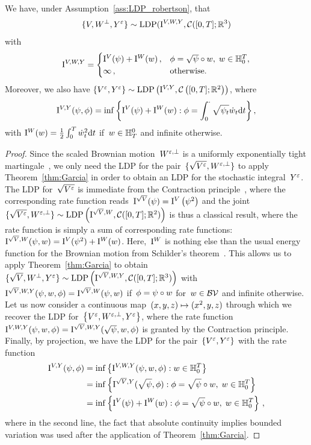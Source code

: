 \begin{theorem}\label{thm:garciaLDP}
We have, under Assumption~\ref{ass:LDP_robertson}, that
$$\{V, W^\perp, Y^{\varepsilon}\}\sim\mathrm{LDP}(\mathrm{I}^{V, W, Y}, \mathcal{C}([0,T]; \mathbb{R}^3)$$
with
\[
\mathrm{I}^{V, W, Y} = 
\begin{cases} \mathrm{I}^{V}(\psi) + \mathrm{I}^{W}(w)\,, & \phi=\sqrt\psi\circ w,\; w\in \mathbb{H}_0^T, \\
\infty\,, & \text{otherwise}.
\end{cases}
\]
Moreover, we also have
$\{V^{\varepsilon}, Y^{\varepsilon}\}\sim\mathrm{LDP}\left(\mathrm{I}^{V,Y},\mathcal{C}\left([0,T]; \mathbb{R}^2\right)\right)$, where
$$
\II^{V,Y}(\psi, \phi)=\inf \left\{\IIV(\psi) + \IIW(w): \phi = \int_{0}^{\cdot} \sqrt{\psi_{t}} \dot{w}_{t} \D t\right\}, %
$$
with
$\mathrm{I}^{W}(w) = \frac{1}{2} \int_{0}^{T} \dot{w}_{t}^{2} \mathrm{d} t$
if~$w \in \mathbb{H}_{T}^{0}$ and infinite otherwise.
\end{theorem}
\begin{proof}
Since the scaled Brownian motion~$W^{\varepsilon,\perp}$ is a uniformly exponentially tight martingale~\cite[Example~2.1]{Garcia2007AIntegrals}, we only need the LDP for the pair~$\{\sqrt{V^\varepsilon}, W^{\varepsilon, \perp}\}$ to apply Theorem~\ref{thm:Garcia} in order to obtain an LDP for the stochastic integral~$Y^\varepsilon$. 
The LDP for~$\sqrt{V^\varepsilon}$ is immediate from the Contraction principle~\cite[Theorem 4.2.1]{Dembo2010LargeApplications}, where the corresponding rate function reads~$\mathrm{I}^{\sqrt{V}}(\psi) = \mathrm{I}^{V}\left(\psi^2\right)$ and the joint~$\{\sqrt{V^{\varepsilon}}, W^{\varepsilon,\perp}\}\sim\mathrm{LDP}\left(\mathrm{I}^{\sqrt{V}, W}, \mathcal{C}([0,T]; \mathbb{R}^2)\right)$ is thus a classical result,
where the rate function is simply a sum of corresponding rate functions:~$\mathrm{I}^{\sqrt{V}, W}(\psi, w)=\mathrm{I}^{V}(\psi^2) + \mathrm{I}^{W}(w)$. Here,~$\mathrm{I}^{W}$ is nothing else than the usual energy function for the Brownian motion from Schilder's theorem~\cite{Schilder1966AsymptoticIntegrals}. This allows us to apply Theorem~\ref{thm:Garcia} to obtain~$\{\sqrt{V}, W^\perp, Y^{\varepsilon}\}\sim\mathrm{LDP}\left(\mathrm{I}^{\sqrt{V}, W, Y}, \mathcal{C}([0,T]; \mathbb{R}^3)\right)$ with~$\mathrm{I}^{\sqrt{V}, W, Y}(\psi, w, \phi) =\nobreak \mathrm{I}^{\sqrt{V}, W}(\psi, w)$ if~${\phi=\nobreak\psi\circ w}$ for~$w\in\mathcal{BV}$ and infinite otherwise. Let us now consider a continuous map~$(x,y,z) \mapsto\nobreak (x^2, y, z)$ through which we recover the LDP for~$\left\{V^\varepsilon, W^{\varepsilon,\perp}, Y^\varepsilon\right\}$, where the rate function~$\mathrm{I}^{V,W,Y}(\psi, w, \phi) =\nobreak \mathrm{I}^{\sqrt V,W,Y}(\sqrt\psi, w, \phi)$ is granted by the Contraction principle. Finally, by projection, we have the LDP for the pair~$\{V^\varepsilon, Y^\varepsilon\}$ with the rate function
\begin{align*}
\mathrm{I}^{V,Y}(\psi,\phi) &= \inf\left\{\mathrm{I}^{V,W,Y}(\psi, w, \phi): w\in \mathbb{H}_0^T\right\} \\
&= \inf\left\{\mathrm{I}^{\sqrt V,Y}(\sqrt\psi,\phi): \phi = \sqrt\psi\circ w,\; w\in \mathbb{H}_0^T\right\} \\ 
&= \inf\left\{\mathrm{I}^{V}(\psi) + \mathrm{I}^{W}(w): \phi=\sqrt\psi\circ w,\; w\in \mathbb{H}_0^T\right\}\,,
\end{align*}
where in the second line, the fact that absolute continuity implies bounded variation was used after the application of Theorem~\ref{thm:Garcia}.
\end{proof}
